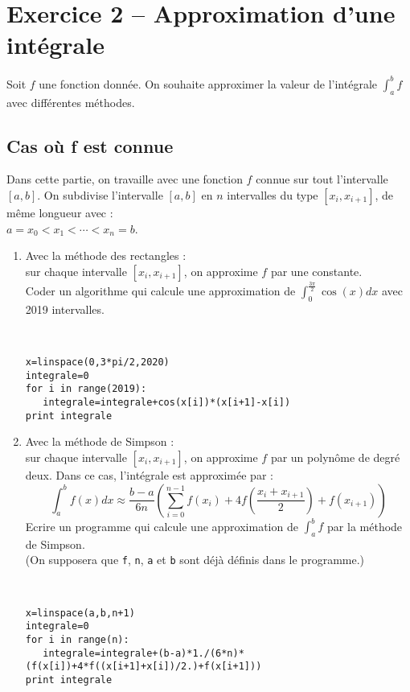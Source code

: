 




\section*{Exercice 2 -- Approximation d'une intégrale}
Soit $f$ une fonction donnée. On souhaite approximer la valeur de l'intégrale $\displaystyle \int_a^b f$ avec différentes méthodes.
\subsection{Cas où f est connue}
Dans cette partie, on travaille avec une fonction $f$ connue sur tout l'intervalle $[a,b]$.
On subdivise l'intervalle $[a,b]$ en $n$ intervalles du type $[x_i,x_{i+1}]$, de même longueur avec : \\ $a=x_0<x_1<\cdots <x_n=b$.
\begin{enumerate}
\item Avec la méthode des rectangles : \\
sur chaque intervalle $[x_i,x_{i+1}]$, on approxime $f$ par une constante. \\
Coder un algorithme qui calcule une approximation de $\displaystyle\int_0^{\frac{3\pi}{2}}\cos(x)dx$ avec 2019 intervalles.
\begin{solution}~\\
\vspace{-1cm}
\begin{verbatim}
x=linspace(0,3*pi/2,2020)
integrale=0
for i in range(2019):
   integrale=integrale+cos(x[i])*(x[i+1]-x[i])	
print integrale	
\end{verbatim}
\end{solution}
\item Avec la méthode de Simpson : \\
sur chaque intervalle $[x_i,x_{i+1}]$, on approxime $f$ par un polynôme de degré deux. Dans ce cas, l'intégrale est approximée par :
\[    {\displaystyle   \int_a^b f(x)dx\approx\frac {b-a}{6n}\left(\sum_{i=0}^{n-1} f(x_i)+4f\left( \frac{x_i+x_{i+1}}{2}\right)+f(x_{i+1}) \right)}\]
Ecrire un programme qui calcule une approximation de $\displaystyle   \int_a^b f$ par la méthode de Simpson.\\ 
(On supposera que \verb?f?, \verb?n?, \verb?a? et \verb?b? sont déjà définis dans le programme.)
\begin{solution}~\\
\vspace{-1cm}
\begin{verbatim}
x=linspace(a,b,n+1)
integrale=0
for i in range(n):
   integrale=integrale+(b-a)*1./(6*n)*(f(x[i])+4*f((x[i+1]+x[i])/2.)+f(x[i+1]))
print integrale	
\end{verbatim}
\end{solution}
\end{enumerate}
